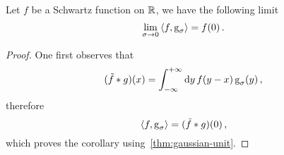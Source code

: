 \begin{corollary}
  Let $f$ be a Schwartz function on $\mathbb{R}$, we have the following limit
  \begin{equation}
    \lim_{\sigma\to0}\braket{f,\operatorname{g}_{\sigma}}=f(0)\,.
  \end{equation}
\end{corollary}
\begin{proof}
  One first observes that
  \begin{equation}
    (\tilde{f}\ast g)(x)=\int_{-\infty}^{+\infty}\mathrm{d}{y}\,f(y-x)\operatorname{g}_{\sigma}(y)\,,
  \end{equation}
  therefore
  \begin{equation}
    \braket{f,\operatorname{g}_{\sigma}}=(\tilde{f}\ast g)(0)\,,
  \end{equation}
  which proves the corollary using~\cref{thm:gaussian-unit}.
\end{proof}
